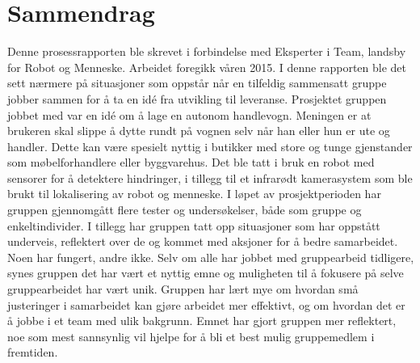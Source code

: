 

\begingroup
\let\clearpage\relax
\let\cleardoublepage\relax
\let\cleardoublepage\relax

\chapter*{Sammendrag} %


Denne prosessrapporten ble skrevet i forbindelse med Eksperter i Team, landsby for Robot og Menneske. Arbeidet foregikk våren 2015. I denne rapporten ble det sett nærmere på situasjoner som oppstår når en tilfeldig sammensatt gruppe jobber sammen for å ta en idé fra utvikling til leveranse. Prosjektet gruppen jobbet med var en idé om å lage en autonom handlevogn. Meningen er at brukeren skal slippe å dytte rundt på vognen selv når han eller hun er ute og handler. Dette kan være spesielt nyttig i butikker med store og tunge gjenstander som møbelforhandlere eller byggvarehus. Det ble tatt i bruk en robot med sensorer for å detektere hindringer, i tillegg til et infrarødt kamerasystem som ble brukt til lokalisering av robot og menneske. I løpet av prosjektperioden har gruppen gjennomgått flere tester og undersøkelser, både som gruppe og enkeltindivider. I tillegg har gr\-uppen tatt opp situasjoner som har oppstått underveis, reflektert over de og kommet med aksjoner for å bedre samarbeidet. Noen har fungert, andre ikke. Selv om alle har jobbet med gruppearbeid tidligere, synes gruppen det har vært et nyttig emne og muligheten til å fokusere på selve gruppearbeidet har vært unik. Gruppen har lært mye om hvordan små justeringer i samarbeidet kan gjøre arbeidet mer effektivt, og om hvordan det er å jobbe i et team med ulik bakgrunn. Emnet har gjort gruppen mer reflektert, noe som mest sannsynlig vil hjelpe for å bli et best mulig gruppemedlem i fremtiden. 

\endgroup			

\vfill